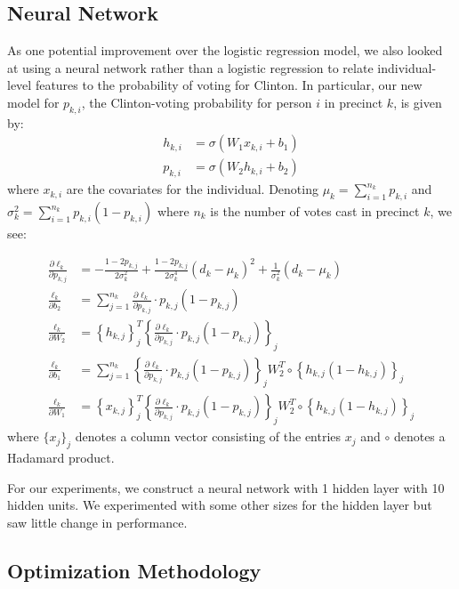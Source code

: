 \documentclass[10pt,twocolumn,letterpaper]{article}
\begin{document}
\subsection{Neural Network} 
As one potential improvement over the logistic regression model, we also looked at using a neural network rather than a logistic regression to relate individual-level features to the probability of voting for Clinton. In particular, our new model for $p_{k, i}$, the Clinton-voting probability for person $i$ in precinct $k$, is given by: 
\begin{align*}
h_{k, i} &= \sigma\left(W_1 x_{k, i} + b_1 \right) \\
p_{k, i} &= \sigma\left(W_2 h_{k, i} + b_2 \right) 
\end{align*}
where $x_{k, i}$ are the covariates for the individual. Denoting $\mu_k = \sum_{i = 1}^{n_k} p_{k, i}$ and $\sigma_k^2 = \sum_{i = 1}^{n_k} p_{k, i} (1 - p_{k, i})$ where $n_k$ is the number of votes cast in precinct $k$, we see: 

\begin{align*}
\frac{\partial \ell_k}{\partial p_{k, j}} &= - \frac{1 - 2p_{k, j}}{2 \sigma_k^2} + \frac{1 - 2p_{k, j}}{2 \sigma_k^4} (d_k - \mu_k)^2  + \frac{1}{\sigma_k^2} \left(d_k - \mu_k \right) \\
\frac{\ell_k}{\partial b_2} &= \sum_{j = 1}^{n_k} \frac{\partial \ell_k}{\partial p_{k, j}} \cdot p_{k, j} (1 - p_{k, j}) \\
\frac{\ell_k}{\partial W_2} &= \left\{ h_{k, j} \right\}_j^T \left\{ \frac{\partial \ell_k}{\partial p_{k, j}} \cdot p_{k, j} (1 - p_{k, j})\right\}_{j} \\
\frac{\ell_k}{\partial b_1} &= \sum_{j = 1}^{n_k} \left\{ \frac{\partial \ell_k}{\partial p_{k, j}} \cdot p_{k, j} (1 - p_{k, j})\right\}_{j} W_2^T \circ \left\{ h_{k, j}(1 - h_{k, j})\right\}_j \\
\frac{\ell_k}{\partial W_1} &= \left\{ x_{k, j} \right\}_j^T \left\{ \frac{\partial \ell_k}{\partial p_{k, j}} \cdot p_{k, j} (1 - p_{k, j})\right\}_{j} W_2^T \circ \left\{ h_{k, j}(1 - h_{k, j})\right\}_j
\end{align*}
where $\{x_j\}_j$ denotes a column vector consisting of the entries $x_j$ and $\circ$ denotes a Hadamard product.

For our experiments, we construct a neural network with 1 hidden layer with 10 hidden units. We experimented with some other sizes for the hidden layer but saw little change in performance.

\subsection{Optimization Methodology}
\end{document}
